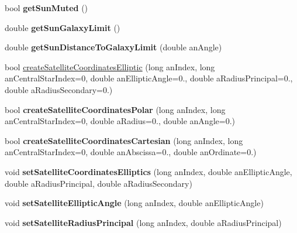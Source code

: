 \begin{DoxyCompactItemize}
\item 
\hypertarget{class_planetary_system_aee867165fa5fe5791e63438254fcbdc1}{bool {\bfseries get\-Sun\-Muted} ()}\label{class_planetary_system_aee867165fa5fe5791e63438254fcbdc1}

\item 
\hypertarget{class_planetary_system_a266735eb39ee8f6c1ea3efe59c46b107}{double {\bfseries get\-Sun\-Galaxy\-Limit} ()}\label{class_planetary_system_a266735eb39ee8f6c1ea3efe59c46b107}

\item 
\hypertarget{class_planetary_system_a12f9958e3e6563ef4495ea9ba4c5f449}{double {\bfseries get\-Sun\-Distance\-To\-Galaxy\-Limit} (double an\-Angle)}\label{class_planetary_system_a12f9958e3e6563ef4495ea9ba4c5f449}

\item 
bool \hyperlink{class_planetary_system_a34cd29ee0fe9d66c6e76a345a8d3f29b}{create\-Satellite\-Coordinates\-Elliptic} (long an\-Index, long an\-Central\-Star\-Index=0, double an\-Elliptic\-Angle=0., double a\-Radius\-Principal=0., double a\-Radius\-Secondary=0.)
\item 
\hypertarget{class_planetary_system_ac154af2e257f5f4124e495996341f489}{bool {\bfseries create\-Satellite\-Coordinates\-Polar} (long an\-Index, long an\-Central\-Star\-Index=0, double a\-Radius=0., double an\-Angle=0.)}\label{class_planetary_system_ac154af2e257f5f4124e495996341f489}

\item 
\hypertarget{class_planetary_system_a2823d2ef7523ba141cae75bbc8fcfe9b}{bool {\bfseries create\-Satellite\-Coordinates\-Cartesian} (long an\-Index, long an\-Central\-Star\-Index=0, double an\-Abscissa=0., double an\-Ordinate=0.)}\label{class_planetary_system_a2823d2ef7523ba141cae75bbc8fcfe9b}

\item 
\hypertarget{class_planetary_system_a81b07fa4038bf81cd63b7cebd8c2881c}{void {\bfseries set\-Satellite\-Coordinates\-Elliptics} (long an\-Index, double an\-Elliptic\-Angle, double a\-Radius\-Principal, double a\-Radius\-Secondary)}\label{class_planetary_system_a81b07fa4038bf81cd63b7cebd8c2881c}

\item 
\hypertarget{class_planetary_system_af1de4998af9170ae77181badcc6590cb}{void {\bfseries set\-Satellite\-Elliptic\-Angle} (long an\-Index, double an\-Elliptic\-Angle)}\label{class_planetary_system_af1de4998af9170ae77181badcc6590cb}

\item 
\hypertarget{class_planetary_system_ab21bfff6c9c4ef0fe984cfa36b676404}{void {\bfseries set\-Satellite\-Radius\-Principal} (long an\-Index, double a\-Radius\-Principal)}\label{class_planetary_system_ab21bfff6c9c4ef0fe984cfa36b676404}


\end{DoxyCompactItemize}
